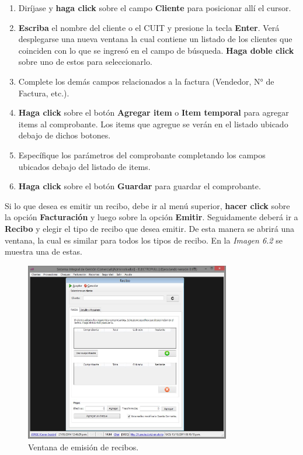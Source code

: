 \documentclass{book}
\begin{document}
\begin{enumerate}
	\itemsep=8pt \topsep=0pt \partopsep=0pt \parskip=0pt \parsep=0pt
	
	\item Diríjase y \textbf{haga click} sobre el campo \textbf{Cliente} para posicionar allí el cursor.

	\item \textbf{Escriba} el nombre del cliente o el CUIT y presione la tecla \textbf{Enter}. Verá desplegarse una nueva ventana la cual contiene un listado de los clientes que coinciden con lo que se ingresó en el campo de búsqueda. \textbf{Haga  doble click} sobre uno de estos para seleccionarlo.

	\item Complete los demás campos relacionados a la factura (Vendedor, N° de Factura, etc.).

	\item \textbf{Haga click} sobre el botón \textbf{Agregar item} o \textbf{Item temporal} para agregar items al comprobante. Los items que agregue se verán en el listado ubicado debajo de dichos botones.

	\item Específique los parámetros del comprobante completando los campos ubicados debajo del listado de items.

	\item \textbf{Haga click} sobre el botón \textbf{Guardar} para guardar el comprobante.

\end{enumerate}
\medskip

Si lo que desea es emitir un recibo, debe ir al menú superior, \textbf{hacer click} sobre la opción \textbf{Facturación} y luego sobre la opción \textbf{Emitir}. Seguidamente deberá ir a \textbf{Recibo} y elegir el tipo de recibo que desea emitir. De esta manera se abrirá una ventana, la cual es similar para todos los tipos de recibo. En la \textit{Imagen 6.2} se muestra una de estas.
\bigskip

\begin{figure}[H]
	\centering
	\includegraphics[width=0.80\textwidth]{images/ventanas/ventana-10.jpg}
	\caption{Ventana de emisión de recibos.}
	\medskip
\end{figure}
\bigskip
\end{document}
